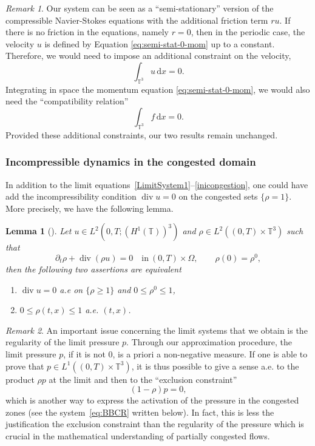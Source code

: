 \documentclass[JEP,XML,SOM,Unicode,NoEqCountersInSection]{cedram}
\newenvironment{enumeratei}
{\bgroup\def\theenumi{\roman{enumi}}\def\theenumii{\arabic{enumii}}\begin{enumerate}}
{\end{enumerate}\egroup}
\newcommand{\<}{\bigl\langle}
\renewcommand{\>}{\bigr\rangle}
\newtheorem{lem}[thm]{Lemma}
\theoremstyle{definition}
\theoremstyle{remark}
\newtheorem{remark}{Remark}
\newcommand{\TT}{\mathbb{T}^3}
\DeclareMathOperator{\Div}{div}
\newcommand{\di}{\,\mathrm{d}}
\begin{document}
\begin{remark}
Our system can be seen as a ``semi-stationary'' version of the compressible Navier-Stokes equations with the additional friction term $ru$. If there is no friction in the equations, namely $r=0$, then in the periodic case, the velocity $u$ is defined by Equation \eqref{eq:semi-stat-0-mom} up to a constant.
Therefore, we would need to impose an additional constraint on the velocity, \eg
\[
\int_{\TT}{u \di x} = 0.
\]
Integrating in space the momentum equation \eqref{eq:semi-stat-0-mom}, we would also need the ``compatibility relation''
\[
\int_{\TT}{f \di x} = 0.
\]
Provided these additional constraints, our two results remain unchanged.
\end{remark}

\subsubsection*{Incompressible dynamics in the congested domain}
In addition to the limit equations~\eqref{LimitSystem1}--\eqref{inicongestion}, one could have add the incompressibility condition $\Div u = 0$ on the congested sets $\{\rho = 1\}$.
More precisely, we have the following lemma.
\begin{lem}[{\cite[Lem.\,2.1]{lions1999}}]
Let $u \in L^2(0,T;(H^1(\mathbb{T}))^3)$ and $\rho\in L^2((0,T)\times\mathbb{T}^3)$ such that
\[
\partial_t \rho+\Div(\rho u)=0 \quad \text{in} \ (0,T)\times\Omega,\qquad \rho(0)=\rho^0,
\]
then the following two assertions are equivalent
\begin{enumeratei}
\item
$\Div u = 0$ a.e on $\{\rho \geq 1\}$ and $0 \leq \rho^0 \leq 1$,
\item
$0 \leq \rho(t,x) \leq 1$ a.e. $(t,x)$.
\end{enumeratei}
\end{lem}

\begin{remark}
An important issue concerning the limit systems that we obtain is the regularity of the limit pressure $p$.
Through our approximation procedure, the limit pressure $p$, if it is not $0$, is a priori a non-negative measure.
If one is able to prove that $p \in L^1((0,T)\times \TT)$, it is thus possible to give a sense a.e. to the product $\rho p$ at the limit and then to the ``exclusion constraint''
\[
(1-\rho) p = 0,
\]
which is another way to express the activation of the pressure in the congested zones (see the system~\eqref{eq:BBCR} written below).
In fact, this is less the justification the exclusion constraint than the regularity of the pressure which is crucial in the mathematical understanding of partially congested flows.
\end{remark}
\end{document}

